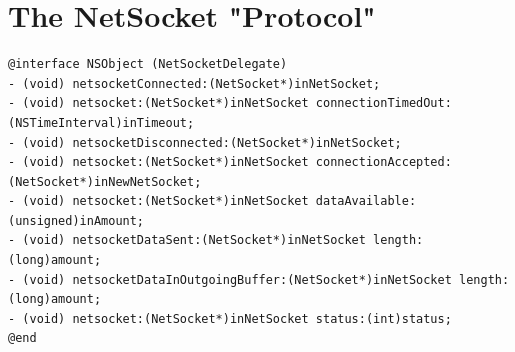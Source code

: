 \documentclass[12pt,a4paper]{article}
\begin{document}
\section{The NetSocket "Protocol"} \label{App:AppendixB}
\begin{lstlisting}
@interface NSObject (NetSocketDelegate)
- (void) netsocketConnected:(NetSocket*)inNetSocket;
- (void) netsocket:(NetSocket*)inNetSocket connectionTimedOut:(NSTimeInterval)inTimeout;
- (void) netsocketDisconnected:(NetSocket*)inNetSocket;
- (void) netsocket:(NetSocket*)inNetSocket connectionAccepted:(NetSocket*)inNewNetSocket;
- (void) netsocket:(NetSocket*)inNetSocket dataAvailable:(unsigned)inAmount;
- (void) netsocketDataSent:(NetSocket*)inNetSocket length:(long)amount;
- (void) netsocketDataInOutgoingBuffer:(NetSocket*)inNetSocket length:(long)amount;
- (void) netsocket:(NetSocket*)inNetSocket status:(int)status;
@end
\end{lstlisting}
\end{document}
